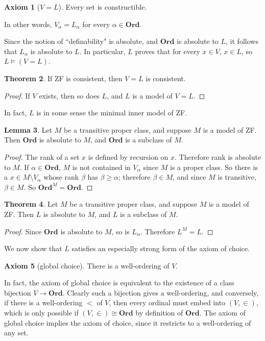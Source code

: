 \documentclass[12pt]{report}
\newcommand{\Ord}{\mathbf{Ord}}
\theoremstyle{definition}
\newtheorem{theorem}{Theorem}[chapter]
\newtheorem{lemma}[theorem]{Lemma}
\newtheorem{axiom}[theorem]{Axiom}
\begin{document}
\begin{axiom}[$V = L$]
    Every set is constructible.
\end{axiom}
In other words, $V_\alpha = L_\alpha$ for every $\alpha \in \Ord$.

Since the notion of ``definability" is absolute, and $\Ord$ is absolute to $L$, it follows that $L_\alpha$ is absolute to $L$. In particular, $L$ proves that for every $x \in V$, $x \in L$, so $L \models (V=L)$.
\begin{theorem}
If ZF is consistent, then $V = L$ is consistent.
\end{theorem}
\begin{proof}
If $V$ exists, then so does $L$, and $L$ is a model of $V = L$.
\end{proof}

In fact, $L$ is in some sense the minimal inner model of ZF.
\begin{lemma}
Let $M$ be a transitive proper class, and suppose $M$ is a model of ZF. Then $\Ord$ is absolute to $M$, and $\Ord$ is a subclass of $M$.
\end{lemma}
\begin{proof}
The rank of a set $x$ is defined by recursion on $x$. Therefore rank is absolute to $M$. If $\alpha \in \Ord$, $M$ is not contained in $V_\alpha$ since $M$ is a proper class. So there is a $x \in M \setminus V_\alpha$ whose rank $\beta$ has $\beta \geq \alpha$; therefore $\beta \in M$, and since $M$ is transitive, $\beta \in M$. So $\Ord^M = \Ord$.
\end{proof}

\begin{theorem}
Let $M$ be a transitive proper class, and suppose $M$ is a model of ZF. Then $L$ is absolute to $M$, and $L$ is a subclass of $M$.
\end{theorem}
\begin{proof}
Since $\Ord$ is absolute to $M$, so is $L_\alpha$. Therefore $L^M = L$.
\end{proof}

We now show that $L$ satisfies an especially strong form of the axiom of choice.
\begin{axiom}[global choice]
  There is a well-ordering of $V$.
\end{axiom}
In fact, the axiom of global choice is equivalent to the existence of a class bijection $V \to \Ord$. Clearly such a bijection gives a well-ordering, and conversely, if there is a well-ordering $<$ of $V$, then every ordinal must embed into $(V, \in)$, which is only possible if $(V, \in) \cong \Ord$ by definition of $\Ord$. The axiom of global choice implies the axiom of choice, since it restricts to a well-ordering of any set.
\end{document}
